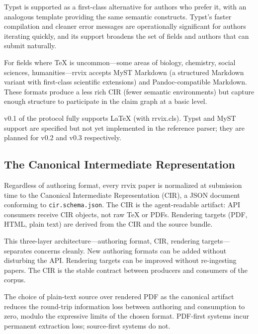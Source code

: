 \documentclass[11pt]{rrvix}
\begin{document}
Typst is supported as a first-class alternative for authors who prefer it, with an analogous template providing the same semantic constructs. Typst's faster compilation and cleaner error messages are operationally significant for authors iterating quickly, and its support broadens the set of fields and authors that can submit naturally.

For fields where TeX is uncommon---some areas of biology, chemistry, social sciences, humanities---rrvix accepts MyST Markdown (a structured Markdown variant with first-class scientific extensions) and Pandoc-compatible Markdown. These formats produce a less rich CIR (fewer semantic environments) but capture enough structure to participate in the claim graph at a basic level.

\begin{scope}
v0.1 of the protocol fully supports LaTeX (with rrvix.cls). Typst and MyST support are specified but not yet implemented in the reference parser; they are planned for v0.2 and v0.3 respectively.
\end{scope}

\subsection{The Canonical Intermediate Representation}

Regardless of authoring format, every rrvix paper is normalized at submission time to the Canonical Intermediate Representation (CIR), a JSON document conforming to \texttt{cir.schema.json}. The CIR is the agent-readable artifact: API consumers receive CIR objects, not raw TeX or PDFs. Rendering targets (PDF, HTML, plain text) are derived from the CIR and the source bundle.

This three-layer architecture---authoring format, CIR, rendering targets---separates concerns cleanly. New authoring formats can be added without disturbing the API. Rendering targets can be improved without re-ingesting papers. The CIR is the stable contract between producers and consumers of the corpus.

\begin{claim}
\label{claim:source-truth}
The choice of plain-text source over rendered PDF as the canonical artifact reduces the round-trip information loss between authoring and consumption to zero, modulo the expressive limits of the chosen format. PDF-first systems incur permanent extraction loss; source-first systems do not.
\end{claim}
\end{document}
